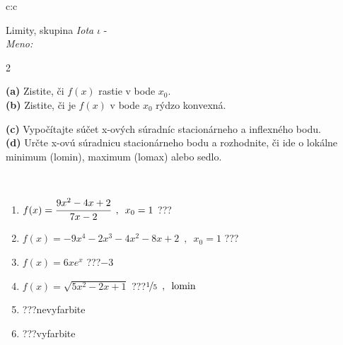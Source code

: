 \documentclass[10pt]{report}
\begin{document}
\begin{tabular}{c:c}
\begin{minipage}[c][104.5mm][t]{0.5\linewidth}
\begin{center}
\vspace{7mm}
{\huge Limity, skupina \textit{Iota $\iota$} -}\\[5mm]
\textit{Meno:}\phantom{xxxxxxxxxxxxxxxxxxxxxxxxxxxxxxxxxxxxxxxxxxxxxxxxxxxxxxxxxxxxxxxxx}\\[5mm]
\begin{minipage}{0.95\linewidth}
\begin{center}
{\small \begin{multicols}{2} \raggedright
\textbf{(a)} Zistite, či \(f(x)\) rastie v bode \(x_0\). \\[1mm]
\textbf{(b)} Zistite, či je \(f(x)\) v bode \(x_0\) rýdzo konvexná. \par \columnbreak
\textbf{(c)} Vypočítajte súčet x-ových súradníc stacionárneho a inflexného bodu. \\[1mm]
\textbf{(d)} Určte x-ovú súradnicu stacionárneho bodu a rozhodnite, či ide o lokálne minimum (lomin), maximum (lomax) alebo sedlo. \\[1mm]
\end{multicols}
}
\end{center}
\end{minipage}
\\[4mm]
\begin{minipage}{0.79\linewidth}
\begin{center}
\begin{varwidth}{\linewidth}
\begin{enumerate}
\normalsize
\item $f(x)=\cfrac{9x^2-4x+2}{7x-2}\enspace , \enspace x_0=1$\quad \dotfill\; ???\;\dotfill \quad {}
\item $f(x)=-9x^4-2x^3-4x^2-8x+2\enspace , \enspace x_0=1$\quad \dotfill\; ???\;\dotfill \quad {}
\item $f(x)=6xe^{x}$\quad \dotfill\; ???\;\dotfill \quad $-3$
\item $f(x)=\sqrt{5x^2-2x+1}$\quad \dotfill\; ???\;\dotfill \quad $\nicefrac{1}{5}\enspace , \enspace\text{lomin}$
\item \quad \dotfill\; ???\;\dotfill \quad nevyfarbite
\item \quad \dotfill\; ???\;\dotfill \quad vyfarbite
\end{enumerate}
\end{varwidth}
\end{center}

\end{minipage}
\end{center}
\end{minipage}
\end{tabular}
\end{document}
